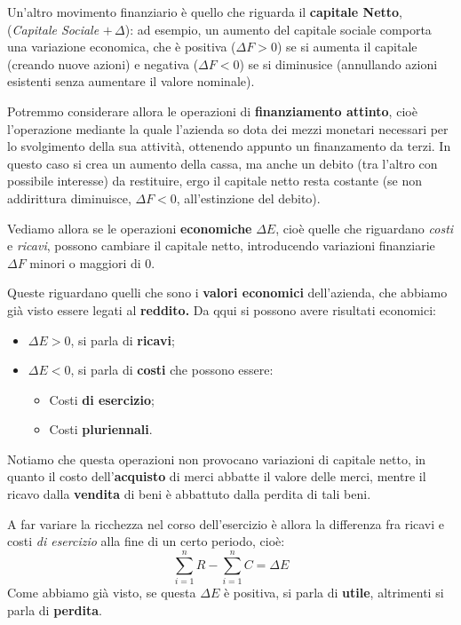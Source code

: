 \documentclass[a4paper,11pt]{article}
\begin{document}
Un'altro movimento finanziario è quello che riguarda il \textbf{capitale Netto}, (\textit{Capitale Sociale} $+ \, \Delta$): ad esempio, un aumento del capitale sociale comporta una variazione economica, che è positiva ($\Delta F > 0$) se si aumenta il capitale (creando nuove azioni) e negativa ($\Delta F < 0$) se si diminusice (annullando azioni esistenti senza aumentare il valore nominale).

Potremmo considerare allora le operazioni di \textbf{finanziamento attinto}, cioè l'operazione mediante la quale l’azienda so dota dei mezzi monetari necessari per lo svolgimento della sua attività, ottenendo appunto un finanzamento da terzi.
In questo caso si crea un aumento della cassa, ma anche un debito (tra l'altro con possibile interesse) da restituire, ergo il capitale netto resta costante (se non addirittura diminuisce, $\Delta F < 0$, all'estinzione del debito).

\par\smallskip

Vediamo allora se le operazioni \textbf{economiche} $\Delta E$, cioè quelle che riguardano \textit{costi} e \textit{ricavi}, possono cambiare il capitale netto, introducendo variazioni finanziarie $\Delta F$ minori o maggiori di 0.

Queste riguardano quelli che sono i \textbf{valori economici} dell'azienda, che abbiamo già visto essere legati al \textbf{reddito.} 
Da qqui si possono avere risultati economici:
\begin{itemize}
	\item $\Delta E > 0$, si parla di \textbf{ricavi};
	\item $\Delta E < 0$, si parla di \textbf{costi} che possono essere:
		\begin{itemize}
			\item Costi \textbf{di esercizio};
			\item Costi \textbf{pluriennali}.
		\end{itemize}
\end{itemize}
Notiamo che questa operazioni non provocano variazioni di capitale netto, in quanto il costo dell'\textbf{acquisto} di merci abbatte il valore delle merci, mentre il ricavo dalla \textbf{vendita} di beni è abbattuto dalla perdita di tali beni.

A far variare la ricchezza nel corso dell'esercizio è allora la differenza fra ricavi e costi \textit{di esercizio} alla fine di un certo periodo, cioè:
$$
\sum_{i = 1}^n R - \sum_{i = 1}^n C = \Delta E
$$
Come abbiamo già visto, se questa $\Delta E$ è positiva, si parla di \textbf{utile}, altrimenti si parla di \textbf{perdita}.
\end{document}

